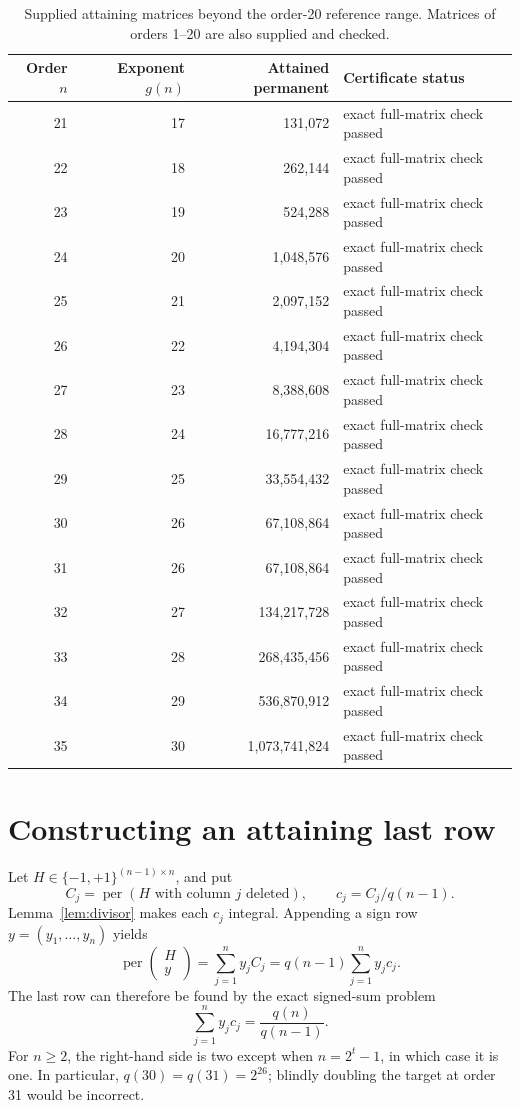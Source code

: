 \documentclass[11pt,a4paper]{article}
\theoremstyle{remark}\newtheorem{remark}[theorem]{Remark}
\DeclareMathOperator{\per}{per}
\begin{document}
\begin{table}[htbp]
\centering\small
\begin{tabular}{rrrl}
\toprule
Order $n$ & Exponent $g(n)$ & Attained permanent & Certificate status\\
\midrule
21 & 17 & 131,072 & exact full-matrix check passed \\
22 & 18 & 262,144 & exact full-matrix check passed \\
23 & 19 & 524,288 & exact full-matrix check passed \\
24 & 20 & 1,048,576 & exact full-matrix check passed \\
25 & 21 & 2,097,152 & exact full-matrix check passed \\
26 & 22 & 4,194,304 & exact full-matrix check passed \\
27 & 23 & 8,388,608 & exact full-matrix check passed \\
28 & 24 & 16,777,216 & exact full-matrix check passed \\
29 & 25 & 33,554,432 & exact full-matrix check passed \\
30 & 26 & 67,108,864 & exact full-matrix check passed \\
31 & 26 & 67,108,864 & exact full-matrix check passed \\
32 & 27 & 134,217,728 & exact full-matrix check passed \\
33 & 28 & 268,435,456 & exact full-matrix check passed \\
34 & 29 & 536,870,912 & exact full-matrix check passed \\
35 & 30 & 1,073,741,824 & exact full-matrix check passed \\
\bottomrule
\end{tabular}

\caption{Supplied attaining matrices beyond the order-20 reference range. Matrices of orders 1--20 are also supplied and checked.}
\label{tab:minima}
\end{table}

\section{Constructing an attaining last row}
Let $H\in\{-1,+1\}^{(n-1)\times n}$, and put
\[
 C_j=\per(H\text{ with column }j\text{ deleted}),\qquad c_j=C_j/q(n-1).
\]
Lemma~\ref{lem:divisor} makes each $c_j$ integral. Appending a sign row $y=(y_1,\ldots,y_n)$ yields
\begin{equation}\label{eq:lastrow}
 \per\!\begin{pmatrix}H\\y\end{pmatrix}
 =\sum_{j=1}^n y_j C_j
 =q(n-1)\sum_{j=1}^n y_j c_j.
\end{equation}
The last row can therefore be found by the exact signed-sum problem
\begin{equation}\label{eq:signedsum}
 \sum_{j=1}^n y_j c_j=\frac{q(n)}{q(n-1)}.
\end{equation}
For $n\geq2$, the right-hand side is two except when $n=2^t-1$, in which case it is one. In particular, $q(30)=q(31)=2^{26}$; blindly doubling the target at order 31 would be incorrect.
\end{document}
